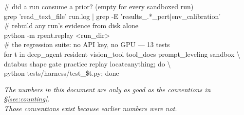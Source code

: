 \documentclass[11pt,a4paper]{report}
\begin{document}
\begin{evidence}[title={Checks}]
\ttfamily\footnotesize
\# did a run consume a prior?  (empty for every sandboxed run)\\
grep 'read\_text\_file' run.log | grep -E 'results\_.*\_pert|env\_calibration'\\[0.5em]
\# rebuild any run's evidence from disk alone\\
python -m rpent.replay \textless run\_dir\textgreater\\[0.5em]
\# the regression suite: no API key, no GPU --- 13 tests\\
for t in deep\_agent resident vision\_tool tool\_docs prompt\_leveling sandbox \textbackslash\\
\hspace*{2.2em}databus shape gate practice replay locateanything; do \textbackslash\\
\hspace*{2.2em}python tests/harness/test\_\$t.py; done
\end{evidence}

\vspace{1em}
\begin{center}
\textit{The numbers in this document are only as good as the conventions in
§\ref{sec:counting}.\\ Those conventions exist because earlier numbers were not.}
\end{center}
\end{document}
